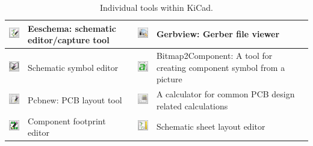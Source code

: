 \documentclass[12pt,letterpaper]{scrartcl}
\begin{document}
\begin{table}[ht]
\caption{Individual tools within KiCad.}
\begin{tabular}{|m{0.5in}|m{2.5in}||m{0.5in}|m{2.5in}|}
\hline \includegraphics[width=0.5in]{eeschema-icon}  &   Eeschema: schematic editor/capture tool & \includegraphics[width=0.5in]{gerbview-icon} &  Gerbview: Gerber file viewer\\ 

\hline \includegraphics[width=0.5in]{sche-lib-icon} &  Schematic symbol editor & \includegraphics[width=0.5in]{bitmap2component-icon} &  Bitmap2Component: A tool for creating component symbol from a picture\\ 

\hline \includegraphics[width=0.5in]{pcbnew-icon} &  Pcbnew: PCB layout tool & \includegraphics[width=0.5in]{calculator-icon} &  A calculator for common PCB design related calculations\\ 

\hline \includegraphics[width=0.5in]{footprint-lib-icon} &  Component footprint editor & \includegraphics[width=0.5in]{pi-editor-icon} &  Schematic sheet layout editor\\ 
\hline 
\end{tabular} 
\end{table}
\end{document}

